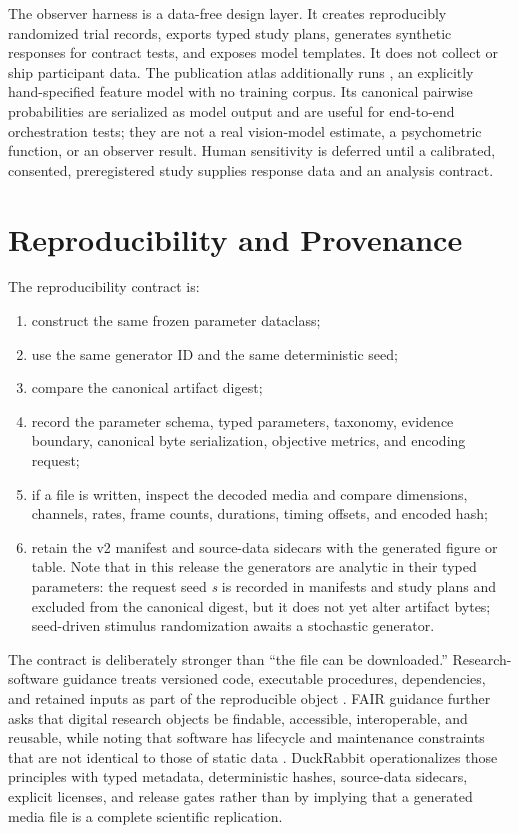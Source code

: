 \documentclass[
  english,
]{article}
\providecommand{\tightlist}{%
  \setlength{\itemsep}{0pt}\setlength{\parskip}{0pt}}
\begin{document}
The observer harness is a data-free design layer. It creates
reproducibly randomized trial records, exports typed study plans,
generates synthetic responses for contract tests, and exposes model
templates. It does not collect or ship participant data. The publication
atlas additionally runs ,
an explicitly hand-specified feature model with no training corpus. Its
canonical pairwise probabilities are serialized as model output and are
useful for end-to-end orchestration tests; they are not a real
vision-model estimate, a psychometric function, or an observer result.
Human sensitivity is deferred until a calibrated, consented,
preregistered study supplies response data and an analysis contract.

\newpage

\section{Reproducibility and Provenance}\label{sec:reproducibility}

The reproducibility contract is:

\begin{enumerate}
\def\labelenumi{\arabic{enumi}.}
\tightlist
\item
  construct the same frozen parameter dataclass;
\item
  use the same generator ID and the same deterministic seed;
\item
  compare the canonical artifact digest;
\item
  record the parameter schema, typed parameters, taxonomy, evidence
  boundary, canonical byte serialization, objective metrics, and
  encoding request;
\item
  if a file is written, inspect the decoded media and compare
  dimensions, channels, rates, frame counts, durations, timing offsets,
  and encoded hash;
\item
  retain the v2 manifest and source-data sidecars with the generated
  figure or table. Note that in this release the generators are analytic
  in their typed parameters: the request seed \emph{s} is recorded in
  manifests and study plans and excluded from the canonical digest, but
  it does not yet alter artifact bytes; seed-driven stimulus
  randomization awaits a stochastic generator.
\end{enumerate}

The contract is deliberately stronger than ``the file can be
downloaded.'' Research-software guidance treats versioned code,
executable procedures, dependencies, and retained inputs as part of the
reproducible object \citep{sandve2013simple, wilson2014bestpractices}.
FAIR guidance further asks that digital research objects be findable,
accessible, interoperable, and reusable, while noting that software has
lifecycle and maintenance constraints that are not identical to those of
static data \citep{wilkinson2016fair, lamprecht2020fairsoftware}.
DuckRabbit operationalizes those principles with typed metadata,
deterministic hashes, source-data sidecars, explicit licenses, and
release gates rather than by implying that a generated media file is a
complete scientific replication.
\end{document}
